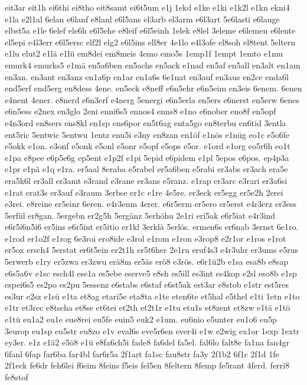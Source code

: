 {eit3ar eit1h ei6thi ei8tho eit8samt ei6t5um e1j 1ekd e1ke e1ki e1k2l
e1kn ekni4 e1la e2l1al 6elan e6lanf e8lanl e6l5ans el3arb el3arm
e6l3art 5e6lasti e6lauge elbst5a e1le 6elef ele6h e6l5ehe e8leif
e6l5einh 1elek e8lel 3eleme e6lemen e6lente el5epi e4l3err e6l5ersc
elf2l elg2 e6l5ins ell8er 4e1lo e4l3ofe el8soh el8tent 5eltern e1lu
elut2 e1l\"a e1l\"u em8dei em8meis 4emo emo5s 1emp1f 1empt 1emto
e1mu emurk4 emurks5 e1m\"a en5a6ben en5achs en5ack e1nad en5af
en5all en3alt en1am en3an.  en3ant en3anz en1a6p en1ar en1a6s 6e1nat
en3auf en3aus en2ce enda6l end5erf end5erg en8dess 4ene.  en5eck
e8neff e6n5ehr e6n5eim en3eis 6enem.  6enen e4nent 4ener.  e8nerd
e6n3erf e4nerg 5energi e6n5erla en5ers e6nerst en5erw 6enes e6n5ess
e2nex en3glo 2eni enni6s5 ennos4 enns8 e1no e6nober eno8f en5opf
e4n3ord en8sers ens8kl en1sp ens6por en5t6ag enta5go en8terbu en6tid
3entla ent5ric 5entwic 5entwu 1entz enu5i e3ny en8zan en1\"of
e1n\"os e1n\"ug eo1c e5o6fe e5okk e1on.  e3onf e5onk e5onl e5onr
e5opf e5ops e5or.  e1ord e1org eo5r6h eo1t e1pa e8pee e6p5e6g ep5ent
e1p2f e1pi 5epid e6pidem e1pl 5epos e6pos.  ep4p3a e1pr e1p\"a e1q
e1ra.  er5aal 8eraba e5rabel er5a6ben e5rabi er3abs er3ach era5e
era5k6l er3all er3amt e3rand e3rane er3ans e5ranz.  e1rap er3arc
e3rari er3a6si e1rat erat3s er3auf e3raum 3erbse er1c e1re 4e5re.
er3eck er5egg er5e2h 2erei e3rei.  e8reine er5einr 6eren.  e4r3enm
4erer.  e6r5erm er5ero er5erst e4r3erz er3ess 5erf\"ul er8gan.
5ergebn er2g5h 5erg\"anz 5erh\"ohu 2e1ri eri5ak e6r5iat e4r3ind
e6r5i6n5i6 er5ins e6r5int er5itio er1kl 3erkl\"a 5erl\"os.
ermen6s er6nab 3ernst 6e1ro.  e1rod er1o2f e1rog 6e3roi ero8ide e3rol
e1rom e1ron e3rop8 e2r1or e1ros e1rot er5ox ersch4 5erstat er6t5ein
er2t1h er5t6her 2e1ru eruf4s3 e4r3uhr er3ums e5rus 5erwerb e1ry er5zwa
er3zwu er\"a8m er5\"as er\"o8 e3r\"os. e6r1\"u2b e1sa
esa8b e8sap e6s5a6v e1sc esch4l ese1a es5ebe eserve5 e8sh es5ill
es3int es4kop e2sl eso8b e1sp espei6s5 es2po es2pu 5essenz e6stabs
e6staf e6st5ak est3ar e8stob e1str est5res es3ur e2sz e1s\"u e1ta
et8ag etari5e eta8ta e1te eten6te et5hal e5thel e1ti 1etn e1to e1tr
et3rec e8tscha et8se et6tei et2th et2t1r e1tu etu1s et8zent et8zw
e1t\"a e1t\"o e1t\"u eu1a2 eu1e eue8rei eu5fe euin5 euk2
e1um.  eu6nio e5unter eu1o6 eu5p 3europ eu1sp eu5str eu8zo e1v eval6s
eve5r6en ever4i e1w e2wig ex1or 1exp 1extr ey3er.  e1z e1\"a2
e5\"o8 e1\"u e8\sses  fa6ch5i fade8 fa6del fa5el.
fal6lo falt8e fa1na fan4gr 6fanl 6fap far6ba far4bl far6r5a 2f1art
fa1sc fau8str fa3y 2f1b2 6f1c 2f1d 1fe 2f1eck fe6dr feh6lei f6eim
8feins f5eis fel5en 8feltern 8femp fe5rant 4ferd.  ferri8 fe8stof
}
